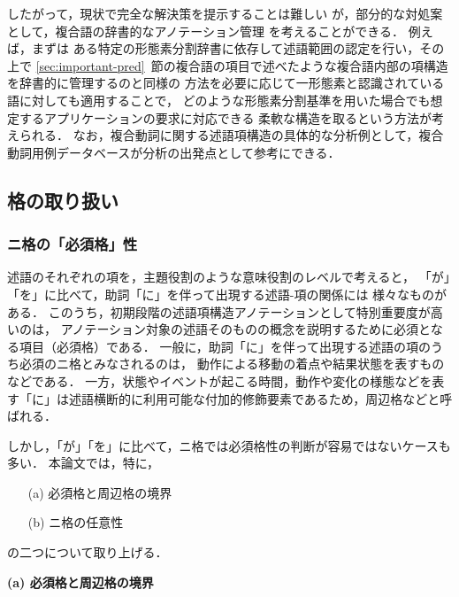 \documentclass[japanese]{jnlp_1.4}
\begin{document}
したがって，現状で完全な解決策を提示することは難しい
が，部分的な対処案として，複合語の辞書的なアノテーション管理
を考えることができる．
例えば，まずは
ある特定の形態素分割辞書に依存して述語範囲の認定を行い，その上で
\ref{sec:important-pred}~節の複合語の項目で述べたような複合語内部の項構造を辞書的に管理するのと同様の
方法を必要に応じて一形態素と認識されている語に対しても適用することで，
どのような形態素分割基準を用いた場合でも想定するアプリケーションの要求に対応できる
柔軟な構造を取るという方法が考えられる．
なお，複合動詞に関する述語項構造の具体的な分析例として，複合動詞用例データベース\cite{yamaguchi2013}が分析の出発点として参考にできる．


\subsection{格の取り扱い}
\label{sec:case}

\subsubsection{ニ格の「必須格」性}
\label{sec:ni-imperativeness}

述語のそれぞれの項を，主題役割のような意味役割のレベルで考えると，
「が」「を」に比べて，助詞「に」を伴って出現する述語-項の関係には
様々なものがある\cite{contemporaryJapanese2,muraki:84}．
このうち，初期段階の述語項構造アノテーションとして特別重要度が高いのは，
アノテーション対象の述語そのものの概念を説明するために必須となる項目（必須格）である．
一般に，助詞「に」を伴って出現する述語の項のうち必須のニ格とみなされるのは，
動作による移動の着点や結果状態を表すものなどである．
一方，状態やイベントが起こる時間，動作や変化の様態などを表す「に」は述語横断的に利用可能な付加的修飾要素であるため，周辺格などと呼ばれる．

しかし，「が」「を」に比べて，ニ格では必須格性の判断が容易ではないケースも多い．
本論文では，特に，
\begin{enumerate}
\item[(a)] 必須格と周辺格の境界
\item[(b)] ニ格の任意性
\end{enumerate}
の二つについて取り上げる．

\noindent
{\bf (a) 必須格と周辺格の境界}
\end{document}
